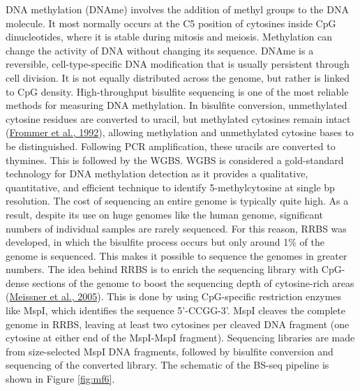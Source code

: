 \documentclass[12pt,twoside]{reedthesis}
\begin{document}
DNA methylation (DNAme) involves the addition of methyl groups to the
DNA molecule. It most normally occurs at the C5 position of cytosines
inside CpG dinucleotides, where it is stable during mitosis and meiosis.
Methylation can change the activity of DNA without changing its
sequence. DNAme is a reversible, cell-type-specific DNA modification
that is usually persistent through cell division. It is not equally
distributed across the genome, but rather is linked to CpG density.
High-throughput bisulfite sequencing is one of the most reliable methods
for measuring DNA methylation. In bisulfite conversion, unmethylated
cytosine residues are converted to uracil, but methylated cytosines
remain intact (\protect\hyperlink{ref-frommer1992}{Frommer et al., 1992}), allowing methylation and unmethylated
cytosine bases to be distinguished. Following PCR amplification, these
uracils are converted to thymines. This is followed by the WGBS. WGBS is
considered a gold-standard technology for DNA methylation detection as
it provides a qualitative, quantitative, and efficient technique to
identify 5-methylcytosine at single bp resolution. The cost of
sequencing an entire genome is typically quite high. As a result,
despite its use on huge genomes like the human genome, significant
numbers of individual samples are rarely sequenced. For this reason,
RRBS was developed, in which the bisulfite process occurs but only
around 1\% of the genome is sequenced. This makes it possible to sequence
the genomes in greater numbers. The idea behind RRBS is to enrich the
sequencing library with CpG-dense sections of the genome to boost the
sequencing depth of cytosine-rich areas (\protect\hyperlink{ref-meissner2005}{Meissner et al., 2005}). This is done by
using CpG-specific restriction enzymes like MspI, which identifies the
sequence 5'-CCGG-3'. MspI cleaves the complete genome in RRBS, leaving
at least two cytosines per cleaved DNA fragment (one cytosine at either
end of the MspI-MspI fragment). Sequencing libraries are made from
size-selected MspI DNA fragments, followed by bisulfite conversion and
sequencing of the converted library. The schematic of the BS-seq
pipeline is shown in Figure \ref{fig:mf6}.
\end{document}
